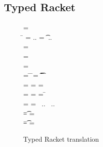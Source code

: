 \documentclass[acmsmall, anonymous, authordraft, review]{acmart} %
\begin{document}



\subsection{Typed Racket}


\begin{figure}[!b]

\hrulefill

\medskip

 \small
\begin{minipage}{12cm}  
\begin{tabbing}
 =  \\
\hspace{4.6cm}\= \WHERE\HS 
  \mdp[1] = \src{\Mdef\m\x\t\tp{\ep[1]}} ..\HS\HS
  \md[1] = \Mdef\m\x\t\tp{\e[1]} ..\HS\HS \\
  \>\qquad\HS\HS\HS\HS \ep[1] = \TRG{\e[1]}{\x:\t\,\this:\C}
\\
\TRG\x\Env = \src{\x}
\\
\TRG{\FRead\f}\Env  = \src{\FRead\f}
\\
\TRG{\FWrite\f\e}\Env =  \src{\FWrite\f\ep} 
\>\WHERE\HS
\= \TypeCk\K{\this}\C \HS\HS
\=  \ep = \TAG\e\Env\t \HS\HS
\= \Ftype\f\t\In\App\K\C
\\
\TRG{\Call{\e[1]}\m{\e[2]}}\Env = \src{\DynCall{\ep[1]}\m{\ep[2]}}
\>\WHERE \> \TypeCk{\K,\Env}{\e[1]}\any \HS
\> \ep[1] = \TRG{\e[1]}\Env \HS
\> \ep[2] = \TAG{\e[2]}\Env\any
\\
\TRG{\Call{\e[1]}\m{\e[2]}}\Env = \src{\KCall{\ep[1]}\m{\ep[2]}{\D[1]}{\D[2]}}
\>\WHERE \> \TypeCk{\K,\Env}{\e[1]}\C 
\> \ep[1] = \TRG{\e[1]}\Env\HS\HS
\> \ep[2] = \TAG{\e[2]}\Env{\D[1]} \HS\HS
\=  \Mtype\m{\D[1]}{\D[2]}\In\App\K\C 
\\
\Env =  
\>\WHERE \>  \ep[1] = \TAG{\e[1]}\Env{\t[1]} ~..
\> \Ftype{\f[1]}{\t[1]}\In\App\K\C ~..
\\
\TAG\e\Env\t = \src\ep
\> \WHERE\> \TypeCk{\K,\Env}\e\tp \HS
\> \EM{\K\vdash \t \Sub \tp}
\>  \ep = \TRG\e\Env
\\
\TAG\e\Env\t = \src{\BehCast\t\e}
\>\WHERE\> \TypeCk{\K,\Env}\e\tp \HS
   \> \EM{\K\vdash \t \not \Sub \tp}
  \>     \ep = \TRG\e\Env
\end{tabbing}
\end{minipage}

\medskip

\hrulefill
\caption{Typed Racket translation}\label{trtr}
\end{figure}
\end{document}
